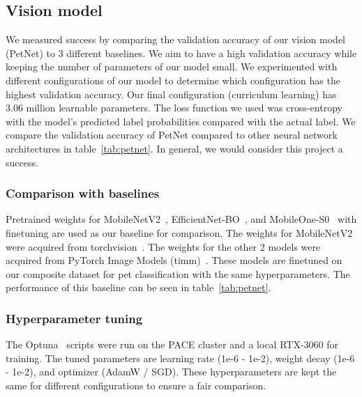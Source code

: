 \documentclass[10pt,twocolumn,letterpaper]{article}
\begin{document}
\subsection{Vision model}
We measured success by comparing the validation accuracy of our vision model (PetNet) to 3 different baselines. We aim to have a high validation accuracy while keeping the number of parameters of our model small. We experimented with different configurations of our model to determine which configuration has the highest validation accuracy. Our final configuration (curriculum learning) has 3.06 million learnable parameters. The loss function we used was cross-entropy with the model's predicted label probabilities compared with the actual label. We compare the validation accuracy of PetNet compared to other neural network architectures in table~\ref{tab:petnet}. In general, we would consider this project a success.

\subsubsection{Comparison with baselines}
Pretrained weights for MobileNetV2~\cite{sandler2018mobilenetv2}, EfficientNet-BO~\cite{tan2019efficientnet}, and MobileOne-S0~\cite{vasu2023mobileone} with finetuning are used as our baseline for comparison. The weights for MobileNetV2 were acquired from torchvision~\cite{marcel2010torchvision}. The weights for the other 2 models were acquired from PyTorch Image Models (timm)~\cite{rw2019timm}. These models are finetuned on our composite dataset for pet classification with the same hyperparameters. The performance of this baseline can be seen in table~\ref{tab:petnet}.

\subsubsection{Hyperparameter tuning}
The Optuna~\cite{akiba2019optuna} scripts were run on the PACE cluster and a local RTX-3060 for training. The tuned parameters are learning rate (1e-6 - 1e-2), weight decay (1e-6 - 1e-2), and optimizer (AdamW / SGD). These hyperparameters are kept the same for different configurations to ensure a fair comparison.
\end{document}
